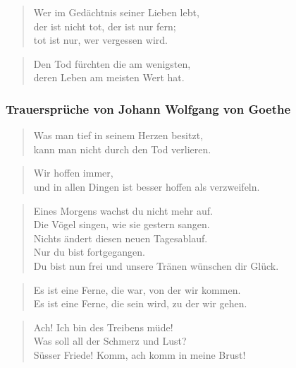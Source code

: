 \documentclass[ngerman,a4paper,11pt]{scrreprt}
\begin{document}
\begin{verse}
Wer im Gedächtnis seiner Lieben lebt, \\
der ist nicht tot, der ist nur fern; \\
tot ist nur, wer vergessen wird. \\
\end{verse}

\begin{verse}
Den Tod fürchten die am wenigsten, \\
deren Leben am meisten Wert hat. \\
\end{verse}

\subsubsection*{Trauersprüche von Johann Wolfgang von Goethe}
\label{sec-2-1-2-3-13}

\begin{verse}
Was man tief in seinem Herzen besitzt, \\
kann man nicht durch den Tod verlieren. \\
\end{verse}

\begin{verse}
Wir hoffen immer, \\
und in allen Dingen ist besser hoffen als verzweifeln. \\
\end{verse}

\begin{verse}
Eines Morgens wachst du nicht mehr auf. \\
Die Vögel singen, wie sie gestern sangen. \\
Nichts ändert diesen neuen Tagesablauf. \\
Nur du bist fortgegangen. \\
Du bist nun frei und unsere Tränen wünschen dir Glück. \\
\end{verse}

\begin{verse}
Es ist eine Ferne, die war, von der wir kommen. \\
Es ist eine Ferne, die sein wird, zu der wir gehen. \\
\end{verse}

\begin{verse}
Ach! Ich bin des Treibens müde! \\
Was soll all der Schmerz und Lust? \\
Süsser Friede! Komm, ach komm in meine Brust! \\
\end{verse}
\end{document}
